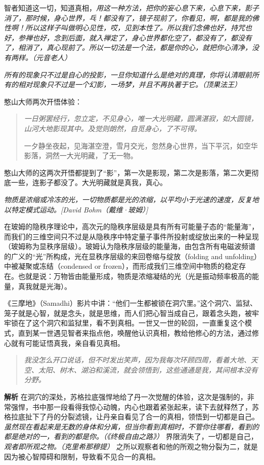 智者知道这一切，知道真相，\textit{用这一种方法，把你的妄心息下来，心息下来，影子消了，那时候，身心世界，乓！都没有了，镜子现前了，你看见，啊，都是我的佛性啊！所以这样子叫做明心见性，哎，见到本性了。所以我们念佛也好，持咒也好，参禅也好，念到后面，就入禅定了，身心世界都化空了，都没有了，都没有了，相消了，真心现前了。所以一切法是一个法，都是你的心，就把你心清净，没有两样。（元音老人）}

\textit{所有的现象只不过是自心的投影，一旦你知道什么是绝对的真理，你将认清眼前所有的相对现象只不过是一个幻影，一场梦，并且不再执著于它。（顶果法王）}

憨山大师两次开悟体验：

\begin{quotation}\it
    一日粥罢经行，忽立定，不见身心，唯一大光明藏，圆满湛寂，如大圆镜，山河大地影现其中。及觉则朗然，自觅身心，了不可得。

    一夕静坐夜起，见海湛空澄，雪月交光，忽然身心世界，当下平沉，如空华影落，洞然一大光明藏，了无一物。
\end{quotation}

憨山大师的这两次开悟都提到了“影”，第一次是影现，第二次是影落，第二次更彻底一些，连影子都没了。大光明藏就是真我，真心。

\textit{物质是浓缩或冷冻的光，一切物质都是光的浓缩，以平均小于光速的速度，反复地以特定模式运动。[David Bohm（戴维·玻姆）]}

在玻姆的隐秩序理论中，高次元的隐秩序层级是具有所有可能量子态的“能量海”，而我们的三维空间只不过是从隐秩序中特定量子事件所投射或绽放出来的一种呈现（玻姆称为显秩序层级）。玻姆认为隐秩序层级的能量海，由包含所有电磁波频谱的广义的“光”所构成，光在显秩序层级的来回卷缩与绽放（folding and unfolding）中被凝聚或冻结（condensed or frozen），而形成我们三维空间中物质的稳定存在。也就是说：万物皆由能量形成，物质是浓缩凝结的光（光是振动频率极高的能量，真我就是光海）。

《三摩地》（Samadhi）影片中讲：“他们一生都被锁在洞穴里。”这个洞穴、监狱、笼子就是心智，就是念头，就是思维，而人们把心智当成自己，跟着念头跑，被牢牢锁在了这个洞穴和监狱里，看不到真相。一世又一世的轮回，一直重复这个模式，直到某一世遇见智者来指点他，唤醒他认识真相，教给他修心的方法，通过修心就有可能证悟真我，亲自看见真相。

\begin{quote}\it
    我没怎么开口说话，但不时发出笑声，因为我每次环顾四周，看着大地、天空、太阳、树木、湖泊和溪流，就会领悟到，这些通通是我，其间根本没有分野。
\end{quote}

\textbf{解析} 在洞穴的深处，苏格拉底强悍地给了丹一次觉醒的体验，这次是强制的，非常强悍，书中那一段看得我惊心动魄，内心也跟着紧张起来，读下去就释然了，苏格拉底扯下了丹的分裂滤镜，让丹亲自看见了合一的真相，领悟到一切都是自己。\textit{虽然现在看起来是无数的身体和分离，但当你看到真相时，不管你往哪看，看到的都是绝对的一，看到的都是你。（《终极自由之路》）} 界限消失了，一切都是自己， \textit{观者即所观之物。（克里希那穆提）} 之所以观察者和他的所观之物分裂为二，就是因为被心智障碍和限制，导致看不见合一的真相。


